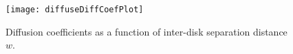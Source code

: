 \documentclass[aps,pre,showpacs,preprint,groupedaddress,floatfix]{revtex4-1}
\begin{document}
\begin{figure}
\texttt{[image: diffuseDiffCoefPlot]}
\caption[]{\label{fig-results} Diffusion coefficients as a function of inter-disk separation distance $w$.}
\end{figure}


%


\end{document}
